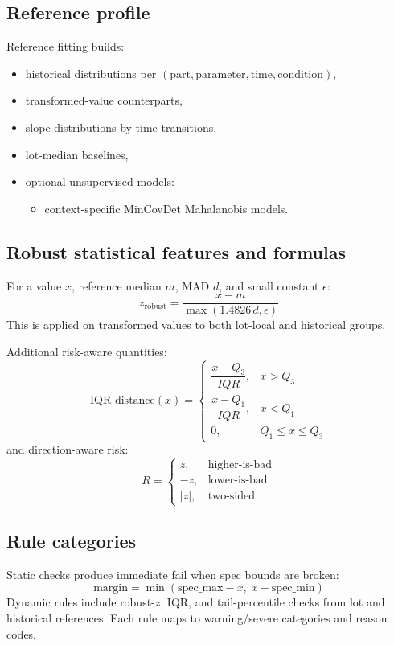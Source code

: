 \documentclass[11pt]{article}
\begin{document}
\subsection{Reference profile}
Reference fitting builds:
\begin{itemize}[nosep]
  \item historical distributions per \((\text{part},\text{parameter},\text{time},\text{condition})\),
  \item transformed-value counterparts,
  \item slope distributions by time transitions,
  \item lot-median baselines,
  \item optional unsupervised models:
  \begin{itemize}
  \item context-specific MinCovDet Mahalanobis models.
  \end{itemize}
\end{itemize}

\subsection{Robust statistical features and formulas}
For a value \(x\), reference median \(m\), MAD \(d\), and small constant \(\epsilon\):
\[
z_{\mathrm{robust}}=\frac{x-m}{\max(1.4826\,d,\epsilon)}
\]
This is applied on transformed values to both lot-local and historical groups.

Additional risk-aware quantities:
\[
\text{IQR distance}(x)=
\begin{cases}
\dfrac{x-Q_3}{IQR}, & x>Q_3\\
\dfrac{x-Q_1}{IQR}, & x<Q_1\\
0, & Q_1\le x\le Q_3
\end{cases}
\]
and direction-aware risk:
\[
R=
\begin{cases}
z, & \text{higher-is-bad}\\
-z, & \text{lower-is-bad}\\
|z|, & \text{two-sided}
\end{cases}
\]

\subsection{Rule categories}
Static checks produce immediate fail when spec bounds are broken:
\[
\text{margin} = \min(\text{spec\_max}-x,\;x-\text{spec\_min})
\]
Dynamic rules include robust-\(z\), IQR, and tail-percentile checks from lot and historical references.  
Each rule maps to warning/severe categories and reason codes.
\end{document}
